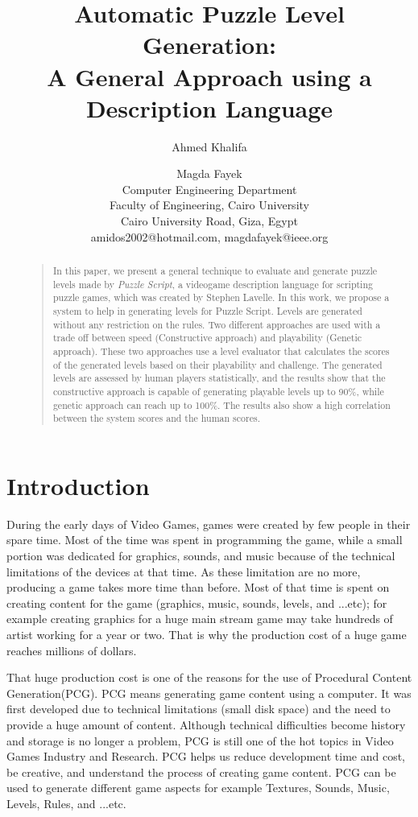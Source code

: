 \documentclass[letterpaper]{article}
\title{Automatic Puzzle Level Generation:\\
A General Approach using a Description Language}
\author{Ahmed Khalifa \and Magda Fayek\\
Computer Engineering Department\\
Faculty of Engineering, Cairo University\\
Cairo University Road, Giza, Egypt\\
amidos2002@hotmail.com, magdafayek@ieee.org\\
}
\begin{document}
 
\maketitle
\begin{abstract}
\begin{quote}
In this paper, we present a general technique to evaluate and generate puzzle levels made by \emph{Puzzle Script}, a videogame description language for scripting puzzle games, which was created by Stephen Lavelle\cite{puzzleScript}. In this work, we propose a system to help in generating levels for Puzzle Script. Levels are generated without any restriction on the rules. Two different approaches are used with a trade off between speed (Constructive approach) and playability (Genetic approach). These two approaches use a level evaluator that calculates the scores of the generated levels based on their playability and challenge. The generated levels are assessed by human players statistically, and the results show that the constructive approach is capable of generating playable levels up to 90\%, while genetic approach can reach up to 100\%. The results also show a high correlation between the system scores and the human scores.
\end{quote}
\end{abstract}

\section{Introduction}
During the early days of Video Games, games were created by few people in their spare time. Most of the time was spent in programming the game, while a small portion was dedicated for graphics, sounds, and music because of the technical limitations of the devices at that time. As these limitation are no more, producing a game takes more time than before. Most of that time is spent on creating content for the game (graphics, music, sounds, levels, and ...etc)\cite{budgetAAA}; for example creating graphics for a huge main stream game may take hundreds of artist working for a year or two. That is why the production cost of a huge game reaches millions of dollars\cite{gameCost}.\\\par

That huge production cost is one of the reasons for the use of Procedural Content Generation(PCG). PCG means generating game content using a computer. It was first developed due to technical limitations (small disk space) and the need to provide a huge amount of content\cite{pcgFirstGame}. Although technical difficulties become history and storage is no longer a problem, PCG is still one of the hot topics in Video Games Industry and Research. PCG helps us reduce development time and cost, be creative, and understand the process of creating game content. PCG can be used to generate different game aspects for example Textures, Sounds, Music, Levels, Rules, and ...etc.\\\par
\end{document}
